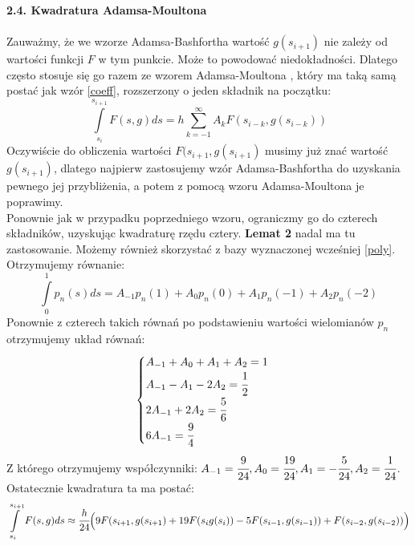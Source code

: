 \documentclass[a4paper]{article}
\begin{document}
\large
\textbf{2.4. Kwadratura Adamsa-Moultona}\\\\
\normalsize
Zauważmy, że we wzorze Adamsa-Bashfortha wartość $g(s_{i+1})$ nie zależy od wartości funkcji $F$ w tym punkcie. Może to powodować niedokładności. Dlatego często stosuje się go razem ze wzorem Adamsa-Moultona \cite{KI}, który ma taką samą postać jak wzór \eqref{coeff}, rozszerzony o jeden składnik na początku:
\begin{equation}
\int\limits_{s_i}^{s_{i+1}} F(s,g) ds = h\sum_{k=-1}^{\infty}A_kF(s_{i-k},g(s_{i-k}))
\end{equation}
Oczywiście do obliczenia wartości $F(s_{i+1}, g(s_{i+1})$ musimy już znać wartość $g(s_{i+1})$, dlatego najpierw zastosujemy wzór Adamsa-Bashfortha do uzyskania pewnego jej przybliżenia, a potem z pomocą wzoru Adamsa-Moultona je poprawimy.\\
Ponownie jak w przypadku poprzedniego wzoru, ograniczmy go do czterech składników, uzyskując kwadraturę rzędu cztery. \textbf{Lemat 2} nadal ma tu zastosowanie. Możemy również skorzystać z bazy wyznaczonej wcześniej \eqref{poly}. Otrzymujemy równanie: 
$$\int\limits_0^1 p_n(s) ds = A_{-1}p_n(1) + A_0p_n(0) + A_1p_n(-1) + A_2p_n(-2)$$
Ponownie z czterech takich równań po podstawieniu wartości wielomianów $p_n$ otrzymujemy układ równań:
$$\begin{cases}
A_{-1} + A_0 + A_1 + A_2 = 1\\
A_{-1} -A_1 -2A_2 = \cfrac{1}{2}\\
2A_{-1} + 2A_2= \cfrac{5}{6}\\
6A_{-1} = \cfrac{9}{4}
\end{cases}$$
Z którego otrzymujemy współczynniki: $A_{-1} = \cfrac{9}{24}, A_0 = \cfrac{19}{24}, A_1 = -\cfrac{5}{24}, A_2 = \cfrac{1}{24}$. Ostatecznie kwadratura ta ma postać:
\begin{equation}\label{AM}
\int\limits_{s_i}^{s_{i+1}} F(s,g) ds \approx \cfrac{h}{24}\Bigl(9F(s_{i+1}, g(s_{i+1}) + 19F(s_ig(s_i)) - 5F(s_{i-1},g(s_{i-1})) + F(s_{i-2},g(s_{i-2}))\Bigr)
\end{equation} 
\end{document}
